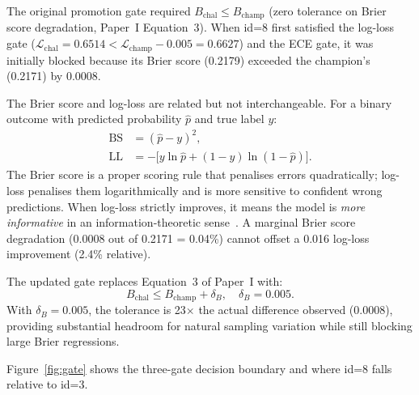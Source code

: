 \documentclass[conference]{IEEEtran}
\begin{document}
The original promotion gate required
$B_\text{chal} \leq B_\text{champ}$ (zero tolerance on Brier score
degradation, Paper~I Equation~3).  When id=8 first satisfied the
log-loss gate ($\mathcal{L}_\text{chal} = 0.6514 <
\mathcal{L}_\text{champ} - 0.005 = 0.6627$) and the ECE gate,
it was initially blocked because its Brier score (0.2179) exceeded
the champion's (0.2171) by 0.0008.

The Brier score and log-loss are related but not interchangeable.
For a binary outcome with predicted probability $\hat{p}$ and true
label $y$:
\begin{align}
  \text{BS} &= (\hat{p} - y)^2, \label{eq:brier}\\
  \text{LL} &= -\bigl[y\ln\hat{p} + (1{-}y)\ln(1{-}\hat{p})\bigr]. \label{eq:logloss}
\end{align}
The Brier score is a proper scoring rule that penalises errors
quadratically; log-loss penalises them logarithmically and is more
sensitive to confident wrong predictions.  When log-loss strictly
improves, it means the model is \emph{more informative} in an
information-theoretic sense~\cite{good1952}.  A marginal Brier score
degradation (0.0008 out of 0.2171 = 0.04\%) cannot offset a 0.016
log-loss improvement (2.4\% relative).

The updated gate replaces Equation~3 of Paper~I with:
\begin{equation}
  B_\text{chal} \leq B_\text{champ} + \delta_B,
  \quad \delta_B = 0.005.
  \label{eq:brier_tol}
\end{equation}
With $\delta_B = 0.005$, the tolerance is 23$\times$ the actual
difference observed (0.0008), providing substantial headroom for
natural sampling variation while still blocking large Brier
regressions.

Figure~\ref{fig:gate} shows the three-gate decision boundary and
where id=8 falls relative to id=3.
\end{document}
